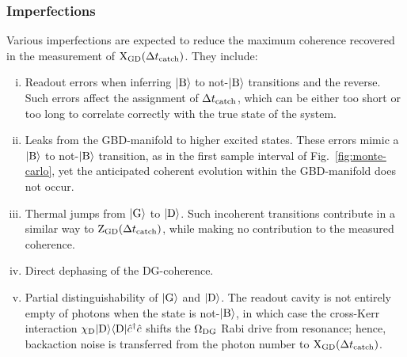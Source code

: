 \documentclass[
						superscriptaddress, 																 amsmath, amssymb,
		 aps,  prb,  
										floatfix,
		linenumbers,
			]{revtex4-1}
\begin{document}
\subsubsection{Imperfections}
Various imperfections are expected to reduce the maximum coherence recovered in the measurement of ${\rm X}_{\rm GD}(\Delta t_{\rm catch})$. They include: \begin{enumerate}[(i)]
\item Readout errors when inferring $|{\rm B}\rangle$ to not-$|{\rm B}\rangle$ transitions and the reverse. Such errors affect the assignment of $\Delta t_{\rm catch}$, which can be either too short or too long to correlate correctly with the true state of the system.
\item Leaks from the GBD-manifold to higher excited states. These errors mimic a $|{\rm B}\rangle$ to not-$|{\rm B}\rangle$ transition, as in the first sample interval of Fig.~\ref{fig:monte-carlo}, yet the anticipated coherent evolution within the GBD-manifold does not occur.
\item Thermal jumps from $|{\rm G}\rangle$ to $|{\rm D}\rangle$. Such incoherent transitions contribute in a similar way to ${\rm Z}_{\rm GD}(\Delta t_{\rm catch})$, while making no contribution to the measured coherence.
\item Direct dephasing of the DG-coherence.
\item Partial distinguishability of $|{\rm G}\rangle$ and $|{\rm D}\rangle$. The readout cavity is not entirely empty of photons when the state is not-$|{\rm B}\rangle$, in which case the cross-Kerr interaction $\chi_{\rm D}|{\rm D}\rangle\langle{\rm D}|\hat c^\dagger\hat c$ shifts the $\Omega_{\rm DG}$ Rabi drive from resonance; hence, backaction noise is transferred from the photon number to ${\rm X_{\rm GD}}(\Delta t_{\rm catch})$.
\end{enumerate}
\end{document}
